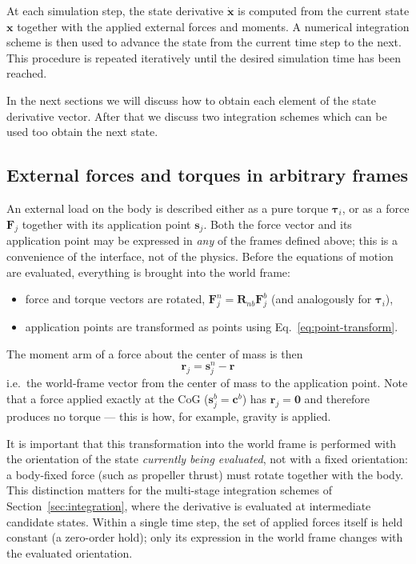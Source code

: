 \documentclass{article}
\begin{document}
	At each simulation step, the state derivative $\dot{\mathbf{x}}$ is computed from the current state $\mathbf{x}$ together with the applied external forces and moments. A numerical integration scheme is then used to advance the state from the current time step to the next. This procedure is repeated iteratively until the desired simulation time has been reached.
	
	In the next sections we will discuss how to obtain each element of the state derivative vector. After that we discuss two integration schemes which can be used too obtain the next state.

	\subsection{External forces and torques in arbitrary frames}

	An external load on the body is described either as a pure torque $\boldsymbol{\tau}_i$, or as a force $\mathbf{F}_j$ together with its application point $\mathbf{s}_j$. Both the force vector and its application point may be expressed in \emph{any} of the frames defined above; this is a convenience of the interface, not of the physics. Before the equations of motion are evaluated, everything is brought into the world frame:
	\begin{itemize}
		\item force and torque vectors are rotated, $\mathbf{F}_j^n = \mathbf{R}_{nb}\mathbf{F}_j^b$ (and analogously for $\boldsymbol{\tau}_i$),
		\item application points are transformed as points using Eq.~\eqref{eq:point-transform}.
	\end{itemize}

	The moment arm of a force about the center of mass is then
	\begin{equation}
		\mathbf{r}_j = \mathbf{s}_j^n - \mathbf{r}
		\label{eq:moment-arm}
	\end{equation}
	i.e.\ the world-frame vector from the center of mass to the application point. Note that a force applied exactly at the CoG ($\mathbf{s}_j^b = \mathbf{c}^b$) has $\mathbf{r}_j = \mathbf{0}$ and therefore produces no torque --- this is how, for example, gravity is applied.

	It is important that this transformation into the world frame is performed with the orientation of the state \emph{currently being evaluated}, not with a fixed orientation: a body-fixed force (such as propeller thrust) must rotate together with the body. This distinction matters for the multi-stage integration schemes of Section~\ref{sec:integration}, where the derivative is evaluated at intermediate candidate states. Within a single time step, the set of applied forces itself is held constant (a zero-order hold); only its expression in the world frame changes with the evaluated orientation.
\end{document}
